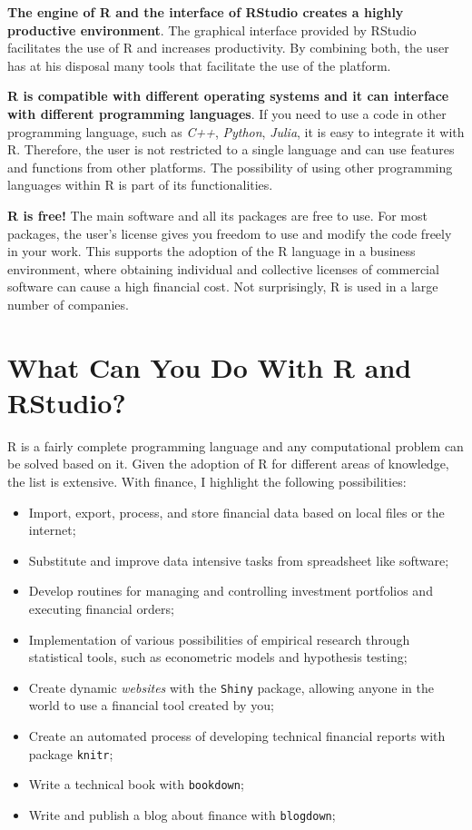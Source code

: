 \documentclass[11pt,]{book}
\begin{document}
\textbf{The engine of R and the interface of RStudio creates a highly
productive environment}. The graphical interface provided by RStudio
facilitates the use of R and increases productivity. By combining both,
the user has at his disposal many tools that facilitate the use of the
platform. 

\textbf{R is compatible with different operating systems and it can
interface with different programming languages}. If you need to use a
code in other programming language, such as \emph{C++}, \emph{Python},
\emph{Julia}, it is easy to integrate it with R. Therefore, the user is
not restricted to a single language and can use features and functions
from other platforms. The possibility of using other programming
languages within R is part of its functionalities. 
 

\textbf{R is free!} The main software and all its packages are free to
use. For most packages, the user's license gives you freedom to use and
modify the code freely in your work. This supports the adoption of the R
language in a business environment, where obtaining individual and
collective licenses of commercial software can cause a high financial
cost. Not surprisingly, R is used in a large number of companies.

\section{What Can You Do With R and
RStudio?}\label{what-can-you-do-with-r-and-rstudio}

R is a fairly complete programming language and any computational
problem can be solved based on it. Given the adoption of R for different
areas of knowledge, the list is extensive. With finance, I highlight the
following possibilities:

\begin{itemize}
\item
  Import, export, process, and store financial data based on local files
  or the internet;
\item
  Substitute and improve data intensive tasks from spreadsheet like
  software;
\item
  Develop routines for managing and controlling investment portfolios
  and executing financial orders;
\item
  Implementation of various possibilities of empirical research through
  statistical tools, such as econometric models and hypothesis testing;
\item
  Create dynamic \emph{websites} with the \texttt{Shiny} package,
  allowing anyone in the world to use a financial tool created by you;
\item
  Create an automated process of developing technical financial reports
  with package \texttt{knitr}; 
\item
  Write a technical book with \texttt{bookdown}; 
\item
  Write and publish a blog about finance with \texttt{blogdown};
\end{itemize}
\end{document}
